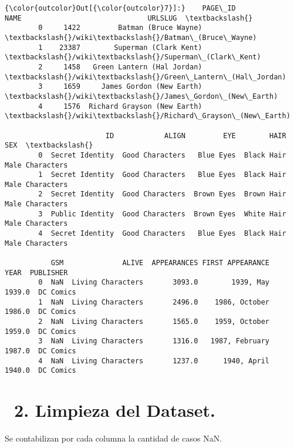 \documentclass[11pt]{article}
\begin{document}
\begin{Verbatim}[commandchars=\\\{\}]
{\color{outcolor}Out[{\color{outcolor}7}]:}    PAGE\_ID                         NAME                              URLSLUG  \textbackslash{}
        0     1422         Batman (Bruce Wayne)         \textbackslash{}/wiki\textbackslash{}/Batman\_(Bruce\_Wayne)   
        1    23387        Superman (Clark Kent)        \textbackslash{}/wiki\textbackslash{}/Superman\_(Clark\_Kent)   
        2     1458   Green Lantern (Hal Jordan)   \textbackslash{}/wiki\textbackslash{}/Green\_Lantern\_(Hal\_Jordan)   
        3     1659     James Gordon (New Earth)     \textbackslash{}/wiki\textbackslash{}/James\_Gordon\_(New\_Earth)   
        4     1576  Richard Grayson (New Earth)  \textbackslash{}/wiki\textbackslash{}/Richard\_Grayson\_(New\_Earth)   
        
                        ID            ALIGN         EYE        HAIR              SEX  \textbackslash{}
        0  Secret Identity  Good Characters   Blue Eyes  Black Hair  Male Characters   
        1  Secret Identity  Good Characters   Blue Eyes  Black Hair  Male Characters   
        2  Secret Identity  Good Characters  Brown Eyes  Brown Hair  Male Characters   
        3  Public Identity  Good Characters  Brown Eyes  White Hair  Male Characters   
        4  Secret Identity  Good Characters   Blue Eyes  Black Hair  Male Characters   
        
           GSM              ALIVE  APPEARANCES FIRST APPEARANCE    YEAR  PUBLISHER  
        0  NaN  Living Characters       3093.0        1939, May  1939.0  DC Comics  
        1  NaN  Living Characters       2496.0    1986, October  1986.0  DC Comics  
        2  NaN  Living Characters       1565.0    1959, October  1959.0  DC Comics  
        3  NaN  Living Characters       1316.0   1987, February  1987.0  DC Comics  
        4  NaN  Living Characters       1237.0      1940, April  1940.0  DC Comics  
\end{Verbatim}
            
    \section{~2. Limpieza del Dataset.}\label{limpieza-del-dataset.}

Se contabilizan por cada columna la cantidad de casos NaN.
\end{document}

